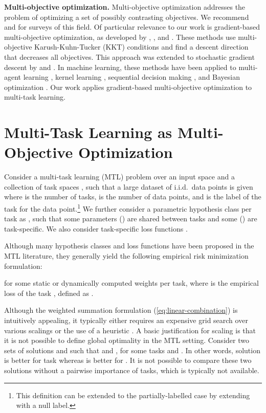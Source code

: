 \documentclass{article}
\begin{document}
\noindent \textbf{Multi-objective optimization.}
Multi-objective optimization addresses the problem of optimizing a set of possibly contrasting objectives. We recommend \citet{Miettinen1999} and \citet{Ehrgott2005} for surveys of this field. Of particular relevance to our work is gradient-based multi-objective optimization, as developed by \citet{Fliege2000}, \citet{Schaffler2002}, and \citet{Desideri2012}. These methods use multi-objective Karush-Kuhn-Tucker (KKT) conditions \citep{Kuhn1951} and find a descent direction that decreases all objectives. This approach was extended to stochastic gradient descent by \citet{Peitz2017} and \citet{Poirion2017}. In machine learning, these methods have been applied to multi-agent learning \citep{Ghish2013, Pirotta2016, Parisi2014}, kernel learning \citep{Cong2014}, sequential decision making \citep{Whiteson2018}, and Bayesian optimization \citep{Shah2016, Lobato2016}. Our work applies gradient-based multi-objective optimization to multi-task learning.
 

\section{Multi-Task Learning as Multi-Objective Optimization}
\label{sec:method}


Consider a multi-task learning (MTL) problem over an input space  and a collection of task spaces , such that a large dataset of i.i.d.\ data points  is given where  is the number of tasks,  is the number of data points, and  is the label of the  task for the  data point.\footnote{This definition can be extended to the partially-labelled case by extending  with a null label.} We further consider a parametric hypothesis class per task as , such that some parameters () are shared between tasks and some () are task-specific. We also consider task-specific loss functions .

Although many hypothesis classes and loss functions have been proposed in the MTL literature, they generally yield the following empirical risk minimization formulation:

for some static or dynamically computed weights  per task, where  is the empirical loss of the task , defined as .

Although the weighted summation formulation (\ref{eq:linear-combination}) is intuitively appealing, it typically either requires an expensive grid search over various scalings or the use of a heuristic \citep{Kendall2018, Chen2018}. A basic justification for scaling is that it is not possible to define global optimality in the MTL setting. Consider two sets of solutions  and  such that  and , for some tasks  and . In other words, solution  is better for task  whereas  is better for . It is not possible to compare these two solutions without a pairwise importance of tasks, which is typically not available.
\end{document}
